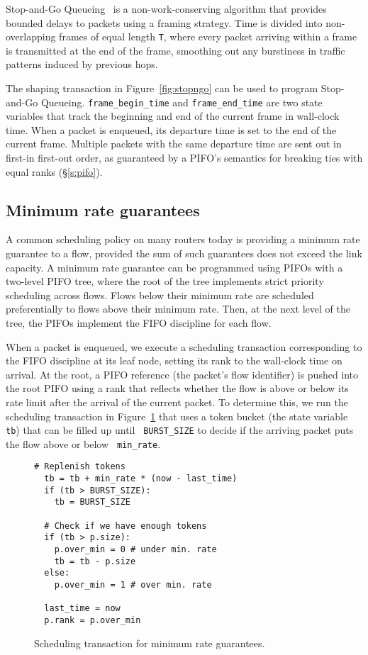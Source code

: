 Stop-and-Go Queueing~\cite{stopngo} is a non-work-conserving algorithm that
provides bounded delays to packets using a framing strategy. Time is divided
into non-overlapping frames of equal length \texttt{T}, where every packet
arriving within a frame is transmitted at the end of the frame, smoothing out
any burstiness in traffic patterns induced by previous hops.

The shaping transaction in Figure~\ref{fig:stopngo} can be used to program
Stop-and-Go Queueing. {\tt frame\_begin\_time} and {\tt frame\_end\_time} are
two state variables that track the beginning and end of the current frame in
wall-clock time.  When a packet is enqueued, its departure time is set to the
end of the current frame.  Multiple packets with the same departure time are
sent out in first-in first-out order, as guaranteed by a PIFO's semantics for
breaking ties with equal ranks (\S\ref{s:pifo}).

\subsection{Minimum rate guarantees}
\label{ss:min_rate}

A common scheduling policy on many routers today is providing a minimum rate
guarantee to a flow, provided the sum of such guarantees does not exceed the
link capacity. A minimum rate guarantee can be programmed using PIFOs with a
two-level PIFO tree, where the root of the tree implements strict priority
scheduling across flows. Flows below their minimum rate are scheduled
preferentially to flows above their minimum rate. Then, at the next level of
the tree, the PIFOs implement the FIFO discipline for each flow.

When a packet is enqueued, we execute a scheduling transaction corresponding to
the FIFO discipline at its leaf node, setting its rank to the wall-clock time
on arrival. At the root, a PIFO reference (the packet's flow identifier) is
pushed into the root PIFO using a rank that reflects whether the flow is above
or below its rate limit after the arrival of the current packet. To determine
this, we run the scheduling transaction in Figure~\ref{fig:min_rate} that uses
a token bucket (the state variable {\tt tb}) that can be filled up until {\tt
BURST\_SIZE} to decide if the arriving packet puts the flow above or below {\tt
min\_rate}.

\begin{figure}
  \begin{lstlisting}[style=customc]
  # Replenish tokens
  tb = tb + min_rate * (now - last_time)
  if (tb > BURST_SIZE):
    tb = BURST_SIZE

  # Check if we have enough tokens
  if (tb > p.size):
    p.over_min = 0 # under min. rate
    tb = tb - p.size
  else:
    p.over_min = 1 # over min. rate

  last_time = now
  p.rank = p.over_min
  \end{lstlisting}
\caption{Scheduling transaction for minimum rate guarantees.}
\label{fig:min_rate}
\end{figure}

